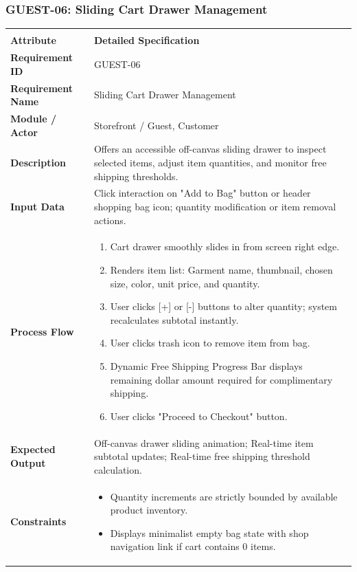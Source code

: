 \documentclass[12pt,a4paper,oneside]{report}
\begin{document}
\subsubsection{GUEST-06: Sliding Cart Drawer Management}
\begin{longtable}{|p{3.6cm}|p{11.9cm}|}
\hline
\rowcolor{PrimaryBrown}
\multicolumn{2}{|p{15.5cm}|}{\textbf{\textcolor{white}{Functional Specification: GUEST-06 -- Sliding Cart Drawer Management}}} \\
\hline
\endfirsthead
\hline
\rowcolor{PrimaryBrown}
\multicolumn{2}{|p{15.5cm}|}{\textbf{\textcolor{white}{Functional Specification: GUEST-06 (Continued)}}} \\
\hline
\textbf{Attribute} & \textbf{Detailed Specification} \\
\hline
\endhead
\hline
\endfoot
\textbf{Requirement ID} & GUEST-06 \\
\hline
\textbf{Requirement Name} & Sliding Cart Drawer Management \\
\hline
\textbf{Module / Actor} & Storefront / Guest, Customer \\
\hline
\textbf{Description} & Offers an accessible off-canvas sliding drawer to inspect selected items, adjust item quantities, and monitor free shipping thresholds. \\
\hline
\textbf{Input Data} & Click interaction on "Add to Bag" button or header shopping bag icon; quantity modification or item removal actions. \\
\hline
\textbf{Process Flow} & \begin{enumerate}[leftmargin=*,nosep,topsep=2pt]
  \item Cart drawer smoothly slides in from screen right edge.
  \item Renders item list: Garment name, thumbnail, chosen size, color, unit price, and quantity.
  \item User clicks [+] or [-] buttons to alter quantity; system recalculates subtotal instantly.
  \item User clicks trash icon to remove item from bag.
  \item Dynamic Free Shipping Progress Bar displays remaining dollar amount required for complimentary shipping.
  \item User clicks "Proceed to Checkout" button.
\end{enumerate} \\
\hline
\textbf{Expected Output} & Off-canvas drawer sliding animation; Real-time item subtotal updates; Real-time free shipping threshold calculation. \\
\hline
\textbf{Constraints} & \begin{itemize}[leftmargin=*,nosep,topsep=2pt]
  \item Quantity increments are strictly bounded by available product inventory.
  \item Displays minimalist empty bag state with shop navigation link if cart contains 0 items.
\end{itemize} \\
\hline
\end{longtable}
\end{document}
